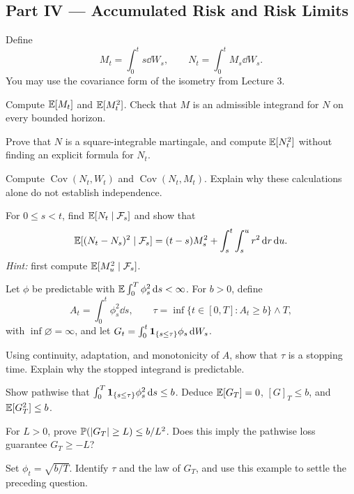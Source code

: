 \clearpage
\subsection*{Part IV --- Accumulated Risk and Risk Limits}

\begin{exercise}
Define
\[
M_t=\int_0^t s\dd W_s,
\qquad
N_t=\int_0^t M_s\dd W_s.
\]
You may use the covariance form of the isometry from Lecture 3.
\begin{exparts}
  \item Compute \(\mathbb{E}[M_t]\) and \(\mathbb{E}[M_t^2]\). Check that \(M\) is
  an admissible integrand for \(N\) on every bounded horizon.
  \item Prove that \(N\) is a square-integrable martingale, and compute
  \(\mathbb{E}[N_t^2]\) without finding an explicit formula for \(N_t\).
  \item Compute \(\operatorname{Cov}(N_t,W_t)\) and
  \(\operatorname{Cov}(N_t,M_t)\). Explain why these calculations alone
  do not establish independence.
  \item For \(0\leq s<t\), find \(\mathbb{E}[N_t\mid\mathcal{F}_s]\) and show that
  \[
  \mathbb{E}[(N_t-N_s)^2\mid\mathcal{F}_s]
  =(t-s)M_s^2+\int_s^t\int_s^u r^2\,\mathrm{d} r\,\mathrm{d} u.
  \]
  \emph{Hint:} first compute \(\mathbb{E}[M_u^2\mid\mathcal{F}_s]\).
\end{exparts}
\end{exercise}

\begin{exercise}
Let \(\phi\) be predictable with
\(\mathbb{E}\int_0^T\phi_s^2\,\mathrm{d} s<\infty\). For \(b>0\), define
\[
A_t=\int_0^t\phi_s^2\dd s,
\qquad
\tau=\inf\{t\in[0,T]:A_t\geq b\}\wedge T,
\]
with \(\inf\varnothing=\infty\), and let
\(G_t=\int_0^t\mathbf{1}_{\{s\leq\tau\}}\phi_s\,\mathrm{d} W_s\).
\begin{exparts}
  \item Using continuity, adaptation, and monotonicity of \(A\), show
  that \(\tau\) is a stopping time. Explain why the stopped integrand
  is predictable.
  \item Show pathwise that
  \(\int_0^T\mathbf{1}_{\{s\leq\tau\}}\phi_s^2\,\mathrm{d} s\leq b\).
  Deduce \(\mathbb{E}[G_T]=0\), \([G]_T\leq b\), and \(\mathbb{E}[G_T^2]\leq b\).
  \item For \(L>0\), prove \(\mathbb{P}(|G_T|\geq L)\leq b/L^2\).
  Does this imply the pathwise loss guarantee \(G_T\geq-L\)?
  \item Set \(\phi_t=\sqrt{b/T}\). Identify \(\tau\) and the law of
  \(G_T\), and use this example to settle the preceding question.
\end{exparts}
\end{exercise}
